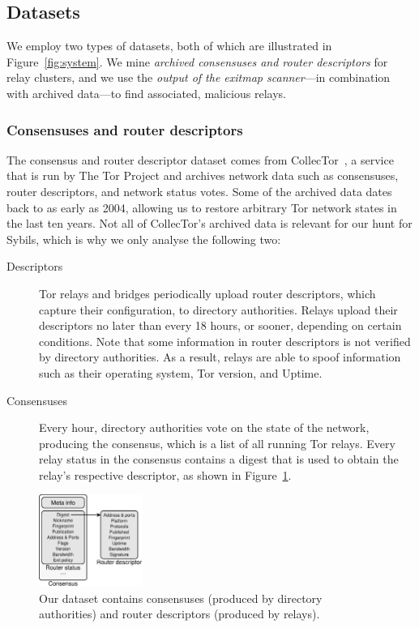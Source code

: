 \subsection{Datasets}
\label{sec:datasets}
We employ two types of datasets, both of which are illustrated in
Figure~\ref{fig:system}.  We mine \emph{archived consensuses and router
descriptors} for relay clusters, and we use the \emph{output of the exitmap
scanner}---in combination with archived data---to find associated, malicious
relays.

\subsubsection{Consensuses and router descriptors}
The consensus and router descriptor dataset comes from
CollecTor~\cite{collector}, a service that is run by The Tor Project and
archives network data such as consensuses, router descriptors, and network
status votes.  Some of the archived data dates back to as early as 2004,
allowing us to restore arbitrary Tor network states in the last ten years.  Not
all of CollecTor's archived data is relevant for our hunt for Sybils, which is
why we only analyse the following two:

\begin{description}
	\item[Descriptors] Tor relays and bridges periodically upload router
		descriptors, which capture their configuration, to directory
		authorities.  Relays upload their descriptors no later than every 18
		hours, or sooner, depending on certain conditions.  Note that some
		information in router descriptors is not verified by directory
		authorities.  As a result, relays are able to spoof information such as
		their operating system, Tor version, and Uptime.

	\item[Consensuses] Every hour, directory authorities vote on the state of
		the network, producing the consensus, which is a list of all running Tor
		relays.  Every relay status in the consensus contains a digest that is
		used to obtain the relay's respective descriptor, as shown in
		Figure~\ref{fig:datasets}.
\end{description}

\begin{figure}[t]
	\centering
	\includegraphics[width=0.3\textwidth]{diagrams/data_sets.pdf}
	\caption{Our dataset contains consensuses (produced by directory
		authorities) and router descriptors (produced by relays).}
	\label{fig:datasets}
\end{figure}


